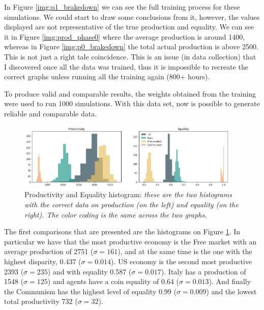 In Figure \ref{img:p1_brakedown} we can see the full training process for these simulations. We could start to draw some conclusions from it, however, the values displayed are not representative of the true production and equality. We can see it in Figure \ref{img:prod_phase0} where the average production is around 1400, whereas in Figure \ref{img:p0_brakedown} the total actual production is above 2500. This is not just a right tale coincidence. This is an issue (in data collection) that I discovered once all the data was trained, thus it is impossible to recreate the correct graphs unless running all the training again (800+ hours).

To produce valid and comparable results, the weights obtained from the training were used to run 1000 simulations. With this data set, now is possible to generate reliable and comparable data.



\begin{figure}[h!]
    \centering
    \linespread{.9}
    \includegraphics[width=0.95\textwidth]{Resources/imgs/hist.png}
    \caption[Productivity and Equality histogram: ]%
    {\label{img:hists}Productivity and Equality histogram: \small \textit{these are the two histograms with the correct data on production (on the left) and equality (on the right). The color coding is the same across the two graphs.}}
\end{figure}


The first comparisons that are presented are the histograms on Figure \ref{img:hists}. In particular we have that the most productive economy is the Free market with an average production of 2751 (\(\sigma = 161\)), and at the same time is the one with the highest disparity, 0.437 (\(\sigma = 0.014\)). US economy is the second most productive
2393 (\(\sigma = 235\)) and with equality 0.587 (\(\sigma = 0.017\)). Italy has a production of 1548 (\(\sigma = 125\)) and agents have a coin equality of 0.64 (\(\sigma = 0.013\)). And finally the Communism has the highest level of equality 0.99 (\(\sigma = 0.009\)) and the lowest total productivity 732 (\(\sigma = 32\)).

